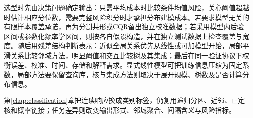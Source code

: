 选型时先由决策问题确定输出：只需平均成本时比较条件均值风险，关心阈值超越时估计相应分位数，需要完整风险积分时才承担分布建模成本。若要求模型无关的有限样本覆盖承诺，再为分割共形或CQR留出独立校准数据；若采用模型内后验区间或参数化频率学区间，则按各自假设构造，并在独立测试数据上检查覆盖与宽度。随后用残差结构判断表示：近似全局关系优先从线性或可加模型开始，局部平滑关系比较邻域方法，明显阈值和交互比较树及其集成；最后在同一验证协议下权衡误差、校准、时间、存储和解释需求。显式线性模型可把训练信息压缩为固定系数，局部方法要保留查询库，核与集成方法则取决于展开规模、树数及是否计算分布信息。

第\ref{chap:classification}章把连续响应换成类别标签，仍复用递归分区、近邻、正定核和概率链接；任务差异则改变输出形式、邻域聚合、间隔含义与风险指标。
